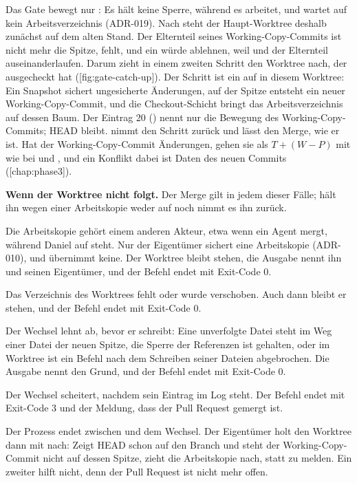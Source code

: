 Das Gate bewegt nur : Es hält keine Sperre, während es arbeitet,
und wartet auf kein Arbeitsverzeichnis (ADR-019).
Nach  steht der Haupt-Worktree deshalb zunächst auf dem alten Stand.
Der Elternteil seines Working-Copy-Commits ist nicht mehr die Spitze,  fehlt,
und ein  würde ablehnen, weil  und der Elternteil auseinanderlaufen.
Darum zieht  in einem zweiten Schritt den Worktree nach, der 
ausgecheckt hat ([fig:gate-catch-up]).
Der Schritt ist ein  auf  in diesem Worktree:
Ein Snapshot sichert ungesicherte Änderungen, auf der Spitze entsteht ein neuer
Working-Copy-Commit, und die Checkout-Schicht bringt das Arbeitsverzeichnis auf dessen Baum.
Der Eintrag 20 () nennt nur die Bewegung des Working-Copy-Commits; HEAD bleibt.
 nimmt den Schritt zurück und lässt den Merge, wie er ist.
Hat der Working-Copy-Commit Änderungen, gehen sie als $T + (W - P)$ mit wie bei 
und , und ein Konflikt dabei ist Daten des neuen Commits
([chap:phase3]).

\startplacefigure[title={Der Haupt-Worktree folgt \type{main} nach dem Merge-Gate},
    reference=fig:gate-catch-up,location=here]
\stopplacefigure

\startinfobox
{\bf Wenn der Worktree nicht folgt.}
Der Merge gilt in jedem dieser Fälle;
 hält ihn wegen einer Arbeitskopie weder auf noch nimmt es ihn zurück.
\startitemize
\item Die Arbeitskopie gehört einem anderen Akteur, etwa wenn ein Agent mergt,
während Daniel auf  steht.
Nur der Eigentümer sichert eine Arbeitskopie (ADR-010), und  übernimmt keine.
Der Worktree bleibt stehen, die Ausgabe nennt ihn und seinen Eigentümer,
und der Befehl endet mit Exit-Code 0.
\item Das Verzeichnis des Worktrees fehlt oder wurde verschoben.
Auch dann bleibt er stehen, und der Befehl endet mit Exit-Code 0.
\item Der Wechsel lehnt ab, bevor er schreibt: Eine unverfolgte Datei steht im Weg einer Datei der
neuen Spitze, die Sperre der Referenzen ist gehalten,
oder im Worktree ist ein Befehl nach dem Schreiben seiner Dateien abgebrochen.
Die Ausgabe nennt den Grund, und der Befehl endet mit Exit-Code 0.
\item Der Wechsel scheitert, nachdem sein Eintrag im Log steht.
Der Befehl endet mit Exit-Code 3 und der Meldung, dass der Pull Request gemergt ist.
\item Der Prozess endet zwischen  und dem Wechsel.
\stopitemize
Der Eigentümer holt den Worktree dann mit  nach:
Zeigt HEAD schon auf den Branch und steht der Working-Copy-Commit nicht auf dessen Spitze,
zieht  die Arbeitskopie nach, statt  zu melden.
Ein zweiter  hilft nicht, denn der Pull Request ist nicht mehr offen.
\stopinfobox


